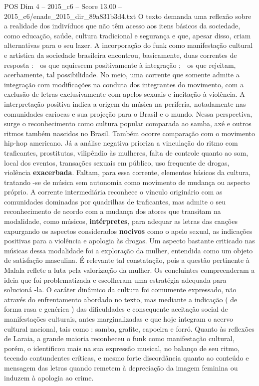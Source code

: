 \begin{textsample}{POS Dim 4 – 2015\_c6 – Score 13.00 – 2015\_c6/enade\_2015\_dir\_89a831b3d4.txt}
O texto demanda uma reflexão sobre a realidade dos indivíduos que não têm acesso aos itens básicos da sociedade, como educação, saúde, cultura tradicional e segurança e que, apesar disso, criam alternativas para o seu lazer.
A incorporação do funk como manifestação cultural e artística da sociedade brasileira encontrou, basicamente, duas correntes de resposta :  os que aquiescem positivamente à integração ;  os que rejeitam, acerbamente, tal possibilidade.
No meio, uma corrente que somente admite a integração com modificações na conduta dos integrantes do movimento, com a exclusão de letras exclusivamente com apelos sexuais e incitação à violência.
A interpretação positiva indica a origem da música na periferia, notadamente nas comunidades cariocas e sua projeção para o Brasil e o mundo.
Nessa perspectiva, surge o reconhecimento como cultura popular comparada ao samba, axé e outros ritmos também nascidos no Brasil.
Também ocorre comparação com o movimento hip-hop americano.
Já a análise negativa prioriza a vinculação do ritmo com traficantes, prostitutas, vilipêndio às mulheres, falta de controle quanto ao som, local dos eventos, transações sexuais em público, uso frequente de drogas, violência \textbf{exacerbada}.
Faltam, para essa corrente, elementos básicos da cultura, tratando -se de música sem autonomia como movimento de mudança ou aspecto próprio.
A corrente intermediária reconhece o vínculo originário com as comunidades dominadas por quadrilhas de traficantes, mas admite o seu reconhecimento de acordo com a mudança dos atores que transitam na modalidade, como músicos, \textbf{intérpretes}, para adequar as letras das canções expurgando os aspectos considerados \textbf{nocivos} como o apelo sexual, as indicações positivas para a violência e apologia às drogas.
Um aspecto bastante criticado nas músicas dessa modalidade foi a exploração da mulher, entendida como um objeto de satisfação masculina.
É relevante tal constatação, pois a questão pertinente à Malala reflete a luta pela valorização da mulher.
Os concluintes compreenderam a ideia que foi problematizada e escolheram uma estratégia adequada para solucioná -la.
O caráter dinâmico da cultura foi comumente expressado, não através do enfrentamento abordado no texto, mas mediante a indicação ( de forma rasa e genérica ) das dificuldades e consequente aceitação social de manifestações culturais, antes marginalizadas e que hoje integram o acervo cultural nacional, tais como : samba, grafite, capoeira e forró.
Quanto às reflexões de Laraia, a grande maioria reconheceu o funk como manifestação cultural, porém, o identificou mais na sua expressão musical, no balanço de seu ritmo, tecendo contundentes críticas, e mesmo forte discordância quanto ao conteúdo e mensagem das letras quando remetem à depreciação da imagem feminina ou induzem à apologia ao crime.

\end{textsample}
